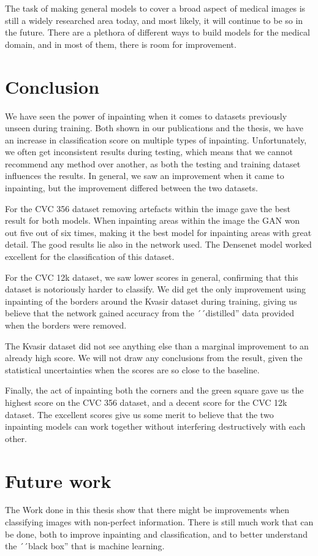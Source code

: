 The task of making general models to cover a broad aspect of medical images is still a widely researched area today, and most likely, it will continue to be so in the future. There are a  plethora of different ways to build models for the medical domain, and in most of them, there is room for improvement.

\section{Conclusion}
We have seen the power of inpainting when it comes to datasets previously unseen during training. Both shown in our publications and the thesis, we have an increase in classification score on multiple types of inpainting.
Unfortunately, we often get inconsistent results during testing, which means that we cannot recommend any method over another, as both the testing and training dataset influences the results.
In general, we saw an improvement when it came to inpainting, but the improvement differed between the two datasets. 

For the CVC 356 dataset removing artefacts within the image gave the best result for both models. When inpainting areas within the image the GAN won out five out of six times, making it the best model for inpainting  areas with great detail. The good results lie also in the network used. The Densenet model worked excellent for the classification of this dataset.


For the CVC 12k dataset, we saw lower scores in general, confirming that this dataset is notoriously harder to classify. We did get the only improvement using inpainting of the borders around the Kvasir dataset during training, giving us believe that the network gained accuracy from the ´´distilled'' data provided when the borders were removed. 

The Kvasir dataset did not see anything else than a marginal improvement to an already high score. We will not draw any conclusions from the result, given the statistical uncertainties when the scores are so close to the baseline.


Finally, the act of inpainting both the corners and the green square gave us the highest score on the CVC 356 dataset, and a decent score for the CVC 12k dataset. The excellent scores give us some merit to believe that the two inpainting models can work together without interfering destructively with each other. 



\section{Future work}
The Work done in this thesis show that there might be improvements when classifying images with non-perfect information. There is still much work that can be done, both to improve inpainting and classification, and to better understand the ´´black box'' that is machine learning. 

